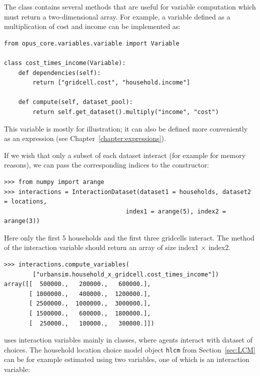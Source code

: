 The  class contains several methods that are useful for
variable computation which must return a two-dimensional array. For example, a
variable defined as a multiplication of cost and income can be implemented as:

\begin{verbatim}
from opus_core.variables.variable import Variable

class cost_times_income(Variable):
    def dependencies(self):
        return ["gridcell.cost", "household.income"]

    def compute(self, dataset_pool):
        return self.get_dataset().multiply("income", "cost")
\end{verbatim}

This  variable is mostly for illustration; it can
also be defined more conveniently as an expression (see Chapter~\ref{chapter:expressions}).

If we wish that only a subset of each dataset interact (for example for
memory reasons), we can pass the corresponding indices to the constructor:
\begin{verbatim}
>>> from numpy import arange
>>> interactions = InteractionDataset(dataset1 = households, dataset2 = locations,
                                  index1 = arange(5), index2 = arange(3))
\end{verbatim}
Here only the first 5 households and the first three gridcells interact.
The  method of the interaction variable should return an array of
size index1 $\times$ index2.


\begin{verbatim}
>>> interactions.compute_variables(
        ["urbansim.household_x_gridcell.cost_times_income"])
array([[  500000.,   200000.,   600000.],
       [ 1000000.,   400000.,  1200000.],
       [ 2500000.,  1000000.,  3000000.],
       [ 1500000.,   600000.,  1800000.],
       [  250000.,   100000.,   300000.]])
\end{verbatim}
\label{page:compute-interaction}

 uses interaction variables mainly in  classes, where agents
interact with dataset of choices. The household location choice model object
\verb|hlcm| from Section~\ref{sec:LCM} can be for example estimated using two
variables, one of which is an interaction variable:

